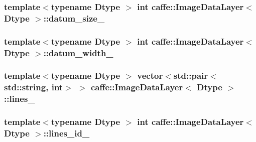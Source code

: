 \hypertarget{classcaffe_1_1_image_data_layer_acbfb83156d383dc61808c419e4005ad9}{
\subsubsection[{datum\+\_\+size\+\_\+}]{\setlength{\rightskip}{0pt plus 5cm}template$<$typename Dtype $>$ int {\bf caffe\+::\+Image\+Data\+Layer}$<$ Dtype $>$\+::datum\+\_\+size\+\_\+\hspace{0.3cm}{\ttfamily [protected]}}}\label{classcaffe_1_1_image_data_layer_acbfb83156d383dc61808c419e4005ad9}
\hypertarget{classcaffe_1_1_image_data_layer_a0daa71d91a0c49e841b39e1a27112220}{
\subsubsection[{datum\+\_\+width\+\_\+}]{\setlength{\rightskip}{0pt plus 5cm}template$<$typename Dtype $>$ int {\bf caffe\+::\+Image\+Data\+Layer}$<$ Dtype $>$\+::datum\+\_\+width\+\_\+\hspace{0.3cm}{\ttfamily [protected]}}}\label{classcaffe_1_1_image_data_layer_a0daa71d91a0c49e841b39e1a27112220}
\hypertarget{classcaffe_1_1_image_data_layer_a72002dc4459f0d7d739779d734a7c684}{
\subsubsection[{lines\+\_\+}]{\setlength{\rightskip}{0pt plus 5cm}template$<$typename Dtype $>$ vector$<$std\+::pair$<$std\+::string, int$>$ $>$ {\bf caffe\+::\+Image\+Data\+Layer}$<$ Dtype $>$\+::lines\+\_\+\hspace{0.3cm}{\ttfamily [protected]}}}\label{classcaffe_1_1_image_data_layer_a72002dc4459f0d7d739779d734a7c684}
\hypertarget{classcaffe_1_1_image_data_layer_a943f32fdd8d0d37883500b6d83d4243f}{
\subsubsection[{lines\+\_\+id\+\_\+}]{\setlength{\rightskip}{0pt plus 5cm}template$<$typename Dtype $>$ int {\bf caffe\+::\+Image\+Data\+Layer}$<$ Dtype $>$\+::lines\+\_\+id\+\_\+\hspace{0.3cm}{\ttfamily [protected]}}}\label{classcaffe_1_1_image_data_layer_a943f32fdd8d0d37883500b6d83d4243f}
